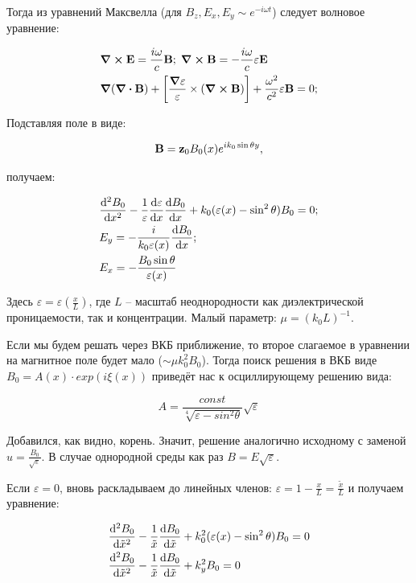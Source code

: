 \documentclass[10pt, a4paper]{article}
\begin{document}
Тогда из уравнений Максвелла (для $B_z, E_x, E_y\sim e^{-i\omega t}$) следует волновое уравнение:

\begin{align*}
	&\curl{\vb{E}} = \frac{i\omega}{c}\vb{B};\;\curl{\vb{B}} = -\frac{i\omega}{c}\vb{\varepsilon\vb{E}}\\
	&\grad{(\div{\vb{B}})} + \left[\frac{\grad{\varepsilon}}{\varepsilon}\times(\curl{\vb{B}})\right] + \frac{\omega^2}{c^2}\varepsilon\vb{B} = 0;	
\end{align*}
 
Подставляя поле в виде:
 
\begin{equation*}
	\vb{B} = \vb{z}_0B_0(x)e^{ik_0\sin\theta y},
\end{equation*}

получаем:

\begin{align*}
	&\dv[2]{B_0}{x} -\frac{1}{\varepsilon}\dv{\varepsilon}{x}\dv{B_0}{x}+k_0(\varepsilon(x)-\sin^2\theta)B_0 = 0; \\
	&E_y = -\frac{i}{k_0\varepsilon(x)}\dv{B_0}{x}; \\
	&E_x = -\frac{B_0\sin\theta}{\varepsilon(x)}
\end{align*}

Здесь $\varepsilon = \varepsilon(\frac{x}{L})$, где $L$ -- масштаб неоднородности как диэлектрической проницаемости, так и концентрации. Малый параметр: $\mu = (k_0L)^{-1}$.

Если мы будем решать через ВКБ приближение, то второе слагаемое в уравнении на магнитное поле будет мало ($\sim\mu k_0^2B_0$). Тогда поиск решения в ВКБ виде $B_0 = A(x)\cdot exp(i\xi(x))$ приведёт нас к осциллирующему решению вида:

\begin{equation*}
	A = \frac{const}{\sqrt[4]{\varepsilon-sin^2\theta}} \sqrt{\varepsilon}
\end{equation*}

Добавился, как видно, корень. Значит, решение аналогично исходному с заменой $u = \frac{B_0}{\sqrt{\varepsilon}}$. В случае однородной среды как раз $B=E\sqrt{\varepsilon}$.

Если $\varepsilon = 0$, вновь раскладываем до линейных членов: $\varepsilon = 1-\frac{x}{L}=\frac{\tilde{x}}{L}$ и получаем уравнение:

\begin{align*}
	&\dv[2]{B_0}{\tilde{x}} - \frac{1}{\tilde{x}}\dv{B_0}{\tilde{x}} + k_0^2(\varepsilon(x)-\sin^2\theta)B_0 = 0 \\
	&\dv[2]{B_0}{\tilde{x}} - \frac{1}{\tilde{x}}\dv{B_0}{\tilde{x}} + k_y^2B_0 = 0
\end{align*}
\end{document}
